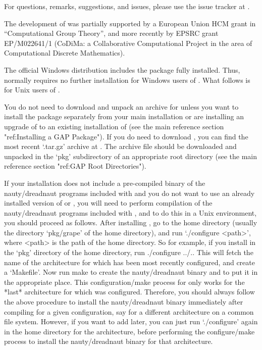 For questions, remarks, suggestions, and issues, please use the issue
tracker at .

The development of {\GRAPE} was partially supported by a European Union
HCM grant in ``Computational Group Theory'', and more recently by EPSRC
grant EP/M022641/1 (CoDiMa: a Collaborative Computational Project in
the area of Computational Discrete Mathematics).


The official {\GAP} Windows distribution includes the {\GRAPE} package
fully installed.  Thus, {\GRAPE} normally requires no further installation
for Windows users of {\GAP}. What follows is for Unix users of {\GRAPE}.

You do not need to download and unpack an archive for {\GRAPE} unless you
want to install the package separately from your main {\GAP} installation
or are installing an upgrade of {\GRAPE} to an existing installation
of {\GAP} (see the main {\GAP} reference section "ref:Installing a GAP
Package").  If you do need to download {\GRAPE}, you can find the most
recent `.tar.gz' archive at .
The archive file should be downloaded and unpacked in the `pkg'
subdirectory of an appropriate {\GAP} root directory (see the main {\GAP}
reference section "ref:GAP Root Directories").

If your {\GRAPE} installation does not include a pre-compiled binary of 
the nauty/dreadnaut programs included with {\GRAPE} and you do not want 
to use an already installed version of {\nauty} or {\bliss}, you will 
need to perform compilation of the nauty/dreadnaut programs included with
{\GRAPE}, and to do this in a Unix environment, you should proceed as
follows.  After installing {\GAP}, go to the {\GRAPE} home directory
(usually the directory `pkg/grape' of the {\GAP} home directory),
and run `./configure <path>', where <path> is the path of the {\GAP}
home directory.  So for example, if you install {\GRAPE} in the `pkg'
directory of the {\GAP} home directory, run 
\begintt 
./configure ../..
\endtt 
This will fetch the name of the architecture for which {\GAP}
has been most recently configured, and create a `Makefile'. Now run
\begintt 
make 
\endtt 
to create the nauty/dreadnaut binary and to put
it in the appropriate place.  This configuration/make process for
{\GRAPE} only works for the *last* architecture for which {\GAP} was
configured. Therefore, you should always follow the above procedure to
install the nauty/dreadnaut binary immediately after compiling {\GAP}
for a given configuration, say for a different architecture on a common
file system. However, if you want to add {\GRAPE} later, you can just run
`./configure' again in the {\GAP} home directory for the architecture,
before performing the {\GRAPE} configure/make process to install the
nauty/dreadnaut binary for that architecture.

